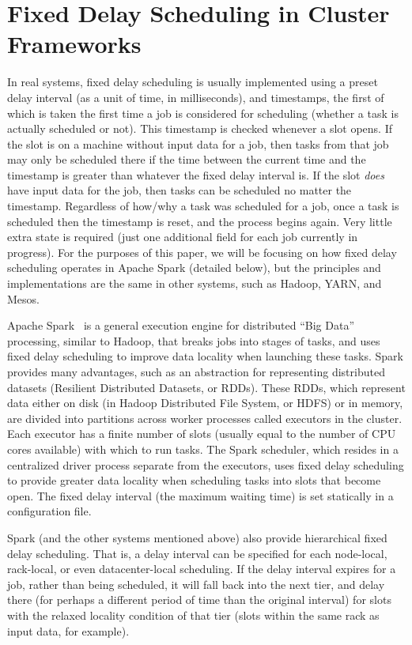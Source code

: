 \section{Fixed Delay Scheduling in Cluster Frameworks}\label{sec:systems}

In real systems, fixed delay scheduling is usually implemented using a preset delay 
interval (as a unit of time, in milliseconds), and timestamps, the first of
which is taken the first time a job is considered for scheduling (whether a task is actually
scheduled or not).
This timestamp is checked whenever a slot opens. If the slot is on a machine
without input data for a job, then tasks from that job may only be scheduled there if
the time between the current time and the timestamp is greater than whatever the fixed delay
interval is. If the slot \textit{does} have input data for the job, then tasks can be scheduled
no matter the timestamp. Regardless of how/why a task was scheduled for a job, once a task
is scheduled then the timestamp is reset, and the process begins again. Very little extra
state is required (just one additional field for each job currently in progress). For the purposes
of this paper, we will be focusing on how fixed delay scheduling operates in Apache Spark (detailed
below), but the principles and implementations are the same in other systems, such as 
Hadoop, YARN, and Mesos.

Apache Spark~\cite{Zaharia2012} is a general execution engine for distributed ``Big Data'' processing, 
similar to Hadoop, that breaks jobs into stages of tasks, and uses fixed delay scheduling to 
improve data locality when launching these tasks. Spark provides many advantages, such 
as an abstraction for representing distributed datasets (Resilient Distributed Datasets, 
or RDDs). These RDDs, which represent data either on disk (in Hadoop Distributed File 
System, or HDFS) or in memory, are divided into partitions across worker processes called 
executors in the cluster. Each executor has a finite number of slots (usually equal to the number 
of CPU cores available) with which to run 
tasks. The Spark scheduler, which resides in a centralized driver process separate from 
the executors, uses fixed delay scheduling to provide greater data locality when scheduling 
tasks into slots that become open. The fixed delay interval (the maximum waiting time) is set 
statically in a configuration file.

Spark (and the other systems mentioned above) also provide hierarchical fixed delay scheduling.
That is, a delay interval can be specified for each node-local, rack-local, or even datacenter-local
scheduling. If the delay interval expires for a job, rather than being scheduled, it will fall back
into the next tier, and delay there (for perhaps a different period of time than the original interval)
for slots with the relaxed locality condition of that tier (slots within the same rack as input data, for
example). 



